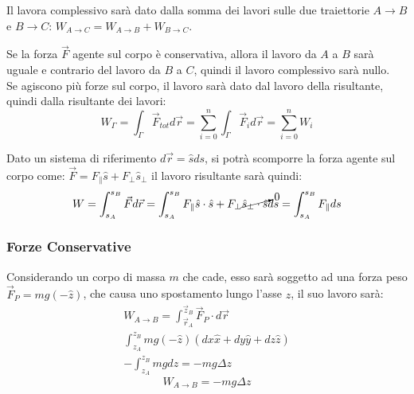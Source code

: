 \documentclass{article}
\numberwithin{equation}{subsection}
\begin{document}
Il lavora complessivo sarà dato dalla somma dei lavori sulle due traiettorie $A\to B$ e $B\to C$: $W_{A\to C}=W_{A\to B}+W_{B\to C}$. 


Se la forza $\vec{F}$ agente sul corpo è conservativa, allora il lavoro 
da $A$ a $B$ sarà uguale e contrario del lavoro da $B$ a $C$, 
quindi il lavoro complessivo sarà nullo.\\
Se agiscono più forze sul corpo, il lavoro sarà dato dal 
lavoro della risultante, quindi dalla risultante dei lavori:
\begin{equation}
    W_{\Gamma}=\displaystyle\int_{\Gamma}\vec{F}_{tot}d\vec{r}=\sum_{i=0}^{n}\int_{\Gamma}\vec{F}_id\vec{r}=\sum_{i=0}^{n}W_i
\end{equation}

Dato un sistema di riferimento $d\vec{r}=\hat{s}ds$, si potrà 
scomporre la forza agente sul corpo come: $\vec{F}=F_{\parallel}\hat{s}+F_{\perp}\hat{s}_{\perp}$ 
il lavoro risultante sarà quindi: 
\begin{equation}
    W=\int_{s_A}^{s_B}\vec{F}d\vec{r}=\int_{s_A}^{s_B}F_{\parallel}\hat{s}\cdot\hat{s}+F_{\perp}\cancelto{0}{\hat{s}_{\perp}\cdot\hat{s}}ds=\int_{s_A}^{s_B}F_{\parallel}ds
\end{equation}

\subsubsection{Forze Conservative}

Considerando un corpo di massa $m$ che cade, esso sarà soggetto 
ad una forza peso $\vec{F}_P=mg(-\hat{z})$, che causa uno spostamento 
lungo l'asse $z$, il suo lavoro sarà:
\begin{gather*}
    W_{A\to B}=\displaystyle\int_{\vec{r}_A}^{\vec{z}_B}\vec{F}_P\cdot d\vec{r}\\
    \displaystyle\int_{z_A}^{z_B}mg(-\hat{z})(dx\hat{x}+dy\hat{y}+dz\hat{z})\\
    \displaystyle-\int_{z_A}^{z_B}mgdz=-mg\Delta z
\end{gather*}
\begin{equation}
    W_{A\to B}=-mg\Delta z
\end{equation}
\begin{center}\end{center}
\end{document}
